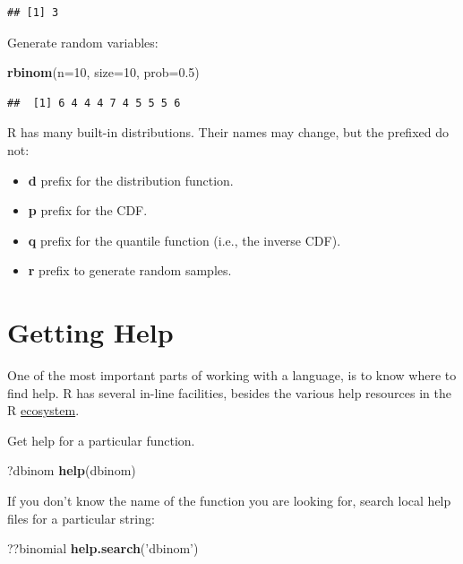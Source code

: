 \documentclass[]{book}
\newenvironment{Shaded}{\begin{snugshade}}{\end{snugshade}}
\newcommand{\KeywordTok}[1]{\textcolor[rgb]{0.13,0.29,0.53}{\textbf{{#1}}}}
\newcommand{\DataTypeTok}[1]{\textcolor[rgb]{0.13,0.29,0.53}{{#1}}}
\newcommand{\DecValTok}[1]{\textcolor[rgb]{0.00,0.00,0.81}{{#1}}}
\newcommand{\FloatTok}[1]{\textcolor[rgb]{0.00,0.00,0.81}{{#1}}}
\newcommand{\StringTok}[1]{\textcolor[rgb]{0.31,0.60,0.02}{{#1}}}
\newcommand{\NormalTok}[1]{{#1}}
\providecommand{\tightlist}{%
  \setlength{\itemsep}{0pt}\setlength{\parskip}{0pt}}
\theoremstyle{definition}
\theoremstyle{definition}
\theoremstyle{remark}
\begin{document}
\begin{verbatim}
## [1] 3
\end{verbatim}

Generate random variables:

\begin{Shaded}
\begin{Highlighting}[]
\KeywordTok{rbinom}\NormalTok{(}\DataTypeTok{n=}\DecValTok{10}\NormalTok{, }\DataTypeTok{size=}\DecValTok{10}\NormalTok{, }\DataTypeTok{prob=}\FloatTok{0.5}\NormalTok{)}
\end{Highlighting}
\end{Shaded}

\begin{verbatim}
##  [1] 6 4 4 4 7 4 5 5 5 6
\end{verbatim}

R has many built-in distributions. Their names may change, but the
prefixed do not:

\begin{itemize}
\tightlist
\item
  \textbf{d} prefix for the distribution function.
\item
  \textbf{p} prefix for the CDF.
\item
  \textbf{q} prefix for the quantile function (i.e., the inverse CDF).
\item
  \textbf{r} prefix to generate random samples.
\end{itemize}

\section{Getting Help}\label{getting-help}

One of the most important parts of working with a language, is to know
where to find help. R has several in-line facilities, besides the
various help resources in the R
\protect\hyperlink{ecosystem}{ecosystem}.

Get help for a particular function.

\begin{Shaded}
\begin{Highlighting}[]
\NormalTok{?dbinom }
\KeywordTok{help}\NormalTok{(dbinom)}
\end{Highlighting}
\end{Shaded}

If you don't know the name of the function you are looking for, search
local help files for a particular string:

\begin{Shaded}
\begin{Highlighting}[]
\NormalTok{??binomial}
\KeywordTok{help.search}\NormalTok{(}\StringTok{'dbinom'}\NormalTok{) }
\end{Highlighting}
\end{Shaded}
\end{document}
